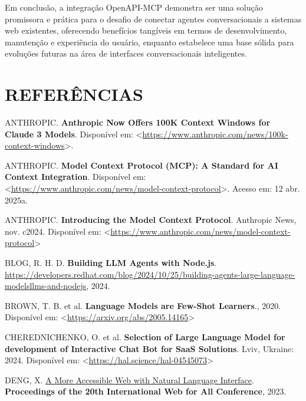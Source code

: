 \documentclass[
]{article}
\newlength{\cslhangindent}
\newenvironment{CSLReferences}[2] %
 {\begin{list}{}{%
  \setlength{\itemindent}{0pt}
  \setlength{\leftmargin}{0pt}
  \setlength{\parsep}{0pt}
  \ifodd #1
   \setlength{\leftmargin}{\cslhangindent}
   \setlength{\itemindent}{-1\cslhangindent}
  \fi
  \setlength{\itemsep}{#2\baselineskip}}}
 {\end{list}}
\begin{document}
Em conclusão, a integração OpenAPI-MCP demonstra ser uma solução
promissora e prática para o desafio de conectar agentes conversacionais
a sistemas web existentes, oferecendo benefícios tangíveis em termos de
desenvolvimento, manutenção e experiência do usuário, enquanto
estabelece uma base sólida para evoluções futuras na área de interfaces
conversacionais inteligentes.

\section*{REFERÊNCIAS}\label{referuxeancias}

\label{refs}
\begin{CSLReferences}{0}{1}
ANTHROPIC. \textbf{Anthropic Now Offers 100K Context Windows for Claude
3 Models}. Disponível em:
\textless{}\url{https://www.anthropic.com/news/100k-context-windows}\textgreater.

ANTHROPIC. \textbf{Model Context Protocol (MCP): A Standard for AI
Context Integration}. Disponível em:
\textless{}\url{https://www.anthropic.com/news/model-context-protocol}\textgreater.
Acesso em: 12 abr. 2025a.

ANTHROPIC. \textbf{{Introducing the Model Context Protocol}}. Anthropic
News, nov. c2024. Disponível em:
\textless{}\url{https://www.anthropic.com/news/model-context-protocol}\textgreater{}

BLOG, R. H. D. \textbf{Building LLM Agents with Node.js}.
\url{https://developers.redhat.com/blog/2024/10/25/building-agents-large-language-modelsllms-and-nodejs},
2024.

BROWN, T. B. et al. \textbf{Language Models are Few-Shot Learners}.,
2020. Disponível em:
\textless{}\url{https://arxiv.org/abs/2005.14165}\textgreater{}

CHEREDNICHENKO, O. et al. \textbf{Selection of Large Language Model for
development of Interactive Chat Bot for SaaS Solutions}. Lviv, Ukraine:
2024. Disponível em:
\textless{}\url{https://hal.science/hal-04545073}\textgreater{}

DENG, X. \href{https://api.semanticscholar.org/CorpusID:258259387}{A
More Accessible Web with Natural Language Interface}.
\textbf{Proceedings of the 20th International Web for All Conference},
2023.


\end{CSLReferences}
\end{document}
